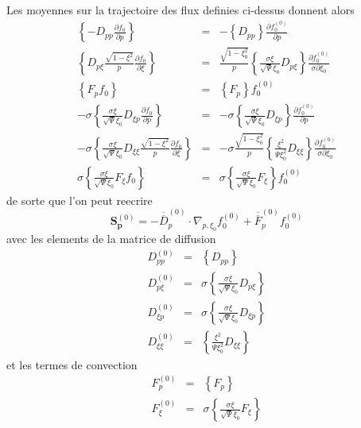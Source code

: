 Les moyennes sur la trajectoire des flux definies ci-dessus donnent
alors\begin{eqnarray*}
\left\{ -D_{pp}\frac{\partial f_{0}}{\partial p}\right\}  & = & -\left\{ D_{pp}\right\} \frac{\partial f_{0}^{(0)}}{\partial p}\\
\left\{ D_{p\xi}\frac{\sqrt{1-\xi^{2}}}{p}\frac{\partial f_{0}}{\partial\xi}\right\}  & = & \frac{\sqrt{1-\xi_{0}^{2}}}{p}\left\{ \frac{\sigma\xi}{\sqrt{\Psi}\xi_{0}}D_{p\xi}\right\} \frac{\partial f_{0}^{(0)}}{\sigma\partial\xi_{0}}\\
\left\{ F_{p}f_{0}\right\}  & = & \left\{ F_{p}\right\} f_{0}^{(0)}\\
-\sigma\left\{ \frac{\sigma\xi}{\sqrt{\Psi}\xi_{0}}D_{\xi p}\frac{\partial f_{0}}{\partial p}\right\}  & = & -\sigma\left\{ \frac{\sigma\xi}{\sqrt{\Psi}\xi_{0}}D_{\xi p}\right\} \frac{\partial f_{0}^{(0)}}{\partial p}\\
-\sigma\left\{ \frac{\sigma\xi}{\sqrt{\Psi}\xi_{0}}D_{\xi\xi}\frac{\sqrt{1-\xi^{2}}}{p}\frac{\partial f_{0}}{\partial\xi}\right\}  & = & -\sigma\frac{\sqrt{1-\xi_{0}^{2}}}{p}\left\{ \frac{\xi^{2}}{\Psi\xi_{0}^{2}}D_{\xi\xi}\right\} \frac{\partial f_{0}^{(0)}}{\sigma\partial\xi_{0}}\\
\sigma\left\{ \frac{\sigma\xi}{\sqrt{\Psi}\xi_{0}}F_{\xi}f_{0}\right\}  & = & \sigma\left\{ \frac{\sigma\xi}{\sqrt{\Psi}\xi_{0}}F_{\xi}\right\} f_{0}^{(0)}\end{eqnarray*}
 de sorte que l'on peut reecrire \[
\mathbf{S}_{\mathbf{p}}^{(0)}=-\overline{\overline{D}}_{p}^{(0)}\cdot\nabla_{p,\xi_{0}}f_{0}^{(0)}+\overline{\overline{F}}_{p}^{(0)}f_{0}^{(0)}\]
 avec les elements de la matrice de diffusion \begin{eqnarray*}
D_{pp}^{(0)} & = & \left\{ D_{pp}\right\} \\
D_{p\xi}^{(0)} & = & \sigma\left\{ \frac{\sigma\xi}{\sqrt{\Psi}\xi_{0}}D_{p\xi}\right\} \\
D_{\xi p}^{(0)} & = & \sigma\left\{ \frac{\sigma\xi}{\sqrt{\Psi}\xi_{0}}D_{\xi p}\right\} \\
D_{\xi\xi}^{(0)} & = & \left\{ \frac{\xi^{2}}{\Psi\xi_{0}^{2}}D_{\xi\xi}\right\} \end{eqnarray*}
 et les termes de convection \begin{eqnarray*}
F_{p}^{(0)} & = & \left\{ F_{p}\right\} \\
F_{\xi}^{(0)} & = & \sigma\left\{ \frac{\sigma\xi}{\sqrt{\Psi}\xi_{0}}F_{\xi}\right\} \end{eqnarray*}



